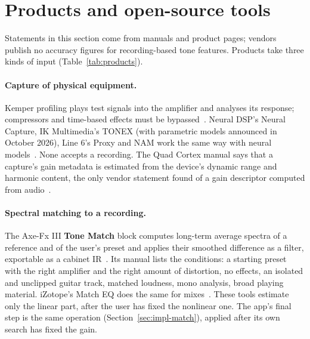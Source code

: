 \section{Products and open-source tools}
\label{sec:products}

Statements in this section come from manuals and product pages; vendors publish
no accuracy figures for recording-based tone features. Products take three kinds
of input (Table~\ref{tab:products}).

\paragraph{Capture of physical equipment.} Kemper profiling plays test signals
into the amplifier and analyses its response; compressors and time-based effects
must be bypassed~\cite{kemper2018manual}. Neural DSP's Neural Capture, IK
Multimedia's TONEX (with parametric models announced in October 2026), Line 6's
Proxy and NAM work the same way with neural
models~\cite{neuraldsp2026qcmanual,ik2026parametric,line6ndproxy,atkinsonndnam}.
None accepts a recording. The Quad Cortex manual says that a capture's gain
metadata is estimated from the device's dynamic range and harmonic content, the
only vendor statement found of a gain descriptor computed from
audio~\cite{neuraldsp2026qcmanual}.

\paragraph{Spectral matching to a recording.} The Axe-Fx III \textbf{Tone Match}
block computes long-term average spectra of a reference and of the user's preset
and applies their smoothed difference as a filter, exportable as a cabinet
IR~\cite{fractalndtonematch}. Its manual lists the conditions: a starting preset
with the right amplifier and the right amount of distortion, no effects, an
isolated and unclipped guitar track, matched loudness, mono analysis, broad
playing material. iZotope's Match EQ does the same for mixes~\cite{izotope2019matcheq}.
These tools estimate only the linear part, after the user has fixed the
nonlinear one. The app's final step is the same operation
(Section~\ref{sec:impl-match}), applied after its own search has fixed the gain.

